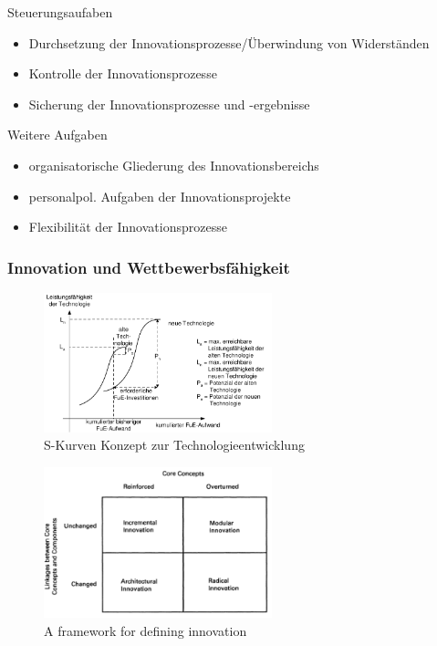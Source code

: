 \documentclass[11pt]{article}
\begin{document}
Steuerungsaufaben
\begin{itemize}
\item Durchsetzung der Innovationsprozesse/Überwindung von Widerständen
\item Kontrolle der Innovationsprozesse
\item Sicherung der Innovationsprozesse und -ergebnisse
\end{itemize}

Weitere Aufgaben
\begin{itemize}
\item organisatorische Gliederung des Innovationsbereichs
\item personalpol. Aufgaben der Innovationsprojekte
\item Flexibilität der Innovationsprozesse
\end{itemize}

\subsubsection{Innovation und Wettbewerbsfähigkeit}
\label{sec:org6dae8bf}
\begin{figure}[htbp]
\centering
\includegraphics[width=250px]{./pictures/inskurv.png}
\caption{S-Kurven Konzept zur Technologieentwicklung}
\end{figure} 

\begin{figure}[htbp]
\centering
\includegraphics[width=250px]{./pictures/insfram.png}
\caption{A framework for defining innovation}
\end{figure} 
\end{document}
